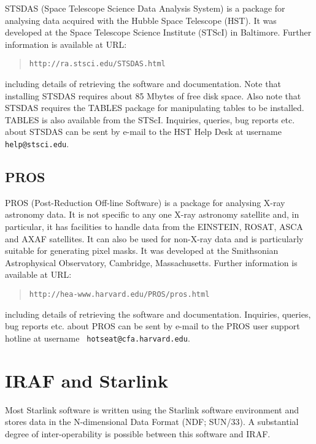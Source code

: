 \documentclass[twoside,11pt]{article}
\newcommand{\htmladdnormallink}[2]{#1}
\newcommand{\xref}[3]{#1}
\newcommand{\xlabel}[1]{}
\begin{document}
STSDAS (Space Telescope Science Data Analysis System) is a package
for analysing data  acquired with the Hubble Space Telescope (HST).
It was developed at the Space Telescope Science Institute (STScI) in
Baltimore.  Further information is available at URL:

\begin{quote}
\htmladdnormallink{ {\tt http://ra.stsci.edu/STSDAS.html} }
   {http://ra.stsci.edu/STSDAS.html}
\end{quote}

including details of retrieving the software and documentation.  Note
that installing STSDAS requires about 85 Mbytes of free disk space.
Also note that STSDAS requires the TABLES package for manipulating
tables to be installed.  TABLES is also available from the STScI.
Inquiries, queries, bug reports etc. about STSDAS can be sent by e-mail
to the HST Help Desk at username {\tt help@stsci.edu}.

\subsection{PROS}

PROS (Post-Reduction Off-line Software) is a package for analysing
X-ray astronomy data.  It is not specific to any one X-ray astronomy
satellite and, in particular, it has facilities to handle data from
the EINSTEIN, ROSAT, ASCA and AXAF satellites.  It can also be used
for non-X-ray data and is particularly suitable for generating pixel
masks.  It was developed at the Smithsonian Astrophysical Observatory,
Cambridge, Massachusetts.  Further information is available at URL:

\begin{quote}
\htmladdnormallink{ {\tt http://hea-www.harvard.edu/PROS/pros.html} }
   {http://hea-www.harvard.edu/PROS/pros.html}
\end{quote}

including details of retrieving the software and documentation.
Inquiries, queries, bug reports etc. about PROS can be sent by e-mail
to the PROS user support hotline at username {\tt
hotseat@cfa.harvard.edu}.


\section{\xlabel{IRAFSTAR}\label{IRAFSTAR}IRAF and Starlink}

Most Starlink software is written using the Starlink software environment
and stores data in the N-dimensional Data Format (NDF;
\xref{SUN/33}{sun33}{}\cite{SUN33}).  A substantial degree of
inter-operability is possible between this software and IRAF.
\end{document}
